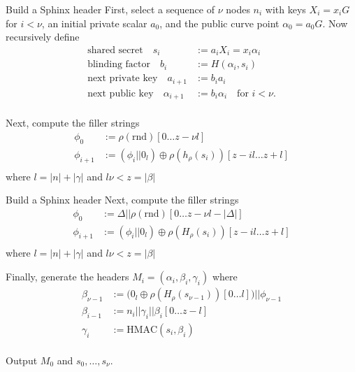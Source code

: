 
\def\mathcomma{}

\begin{frame}{Build a Sphinx header}
First, select a sequence of $\nu$ nodes $n_i$ with keys $X_i = x_i G$ for $i<\nu$,
 an initial private scalar $a_0$, and
 the public curve point $\alpha_0 = a_0 G$.
Now recursively define 
\[ \begin{aligned}
\textrm{shared secret}\quad
 s_i &:= a_i X_i = x_i \alpha_i \mathcomma \\
\textrm{blinding factor}\quad
 b_i &:= H(\alpha_i,s_i) \mathcomma \\
\textrm{next private key}\quad
 a_{i+1} &:= b_i a_i \mathcomma \\ %
\textrm{next public key}\quad
 \alpha_{i+1} &:= b_i \alpha_i \quad\textrm{for $i < \nu$.} \\
\end{aligned} \]

Next, compute the filler strings
\[ \begin{aligned}
 \phi_0 &:= \rho(\textrm{rnd})[0 \ldots z - \nu l] \\
 \phi_{i+1} &:= (\phi_i || 0_l) \oplus \rho(h_\rho(s_i))[ z-il \ldots z+l ] \\
\end{aligned} \]
where $l = |n| + |\gamma|$ and $l \nu < z = |\beta|$

\end{frame}


\begin{frame}{Build a Sphinx header}
Next, compute the filler strings
\[ \begin{aligned}
 \phi_0 &:= \Delta || \rho(\textrm{rnd})[0 \ldots z - \nu l - |\Delta|] \\
 \phi_{i+1} &:= (\phi_i || 0_l) \oplus \rho(H_\rho(s_i))[ z-il \ldots z+l ] \\
\end{aligned} \]
where $l = |n| + |\gamma|$ and $l \nu < z = |\beta|$

\medskip

Finally, generate the headers $M_i = (\alpha_i,\beta_i,\gamma_i)$ where 
\[ \begin{aligned}
 \beta_{\nu-1} &:= \big( 0_l \oplus \rho(H_\rho(s_{\nu-1}))[ 0 \ldots l ] \big)
   || \phi_{\nu-1} \\
 \beta_{i-1} &:= n_i || \gamma_i || \beta_i[0 \ldots z-l] \\
 \gamma_i &:= \textrm{HMAC}(s_i,\beta_i) \\
\end{aligned} \]

\medskip
Output $M_0$ and $s_0,\ldots,s_\nu$.

\end{frame}


